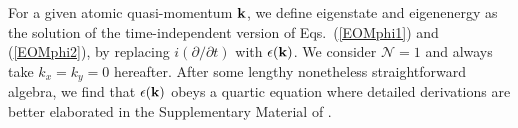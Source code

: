 \documentclass[atoms,article,submit,moreauthors,pdftex,12pt,a4paper]{mdpi}
\begin{document}
For a given atomic quasi-momentum ${\bf k}$, we define eigenstate and eigenenergy as the solution of the time-independent version of Eqs.~(\ref{EOMphi1}) and (\ref{EOMphi2}),  by replacing $i(\partial/\partial t)$ with $\epsilon({\bf k})$. We consider $\mathcal{N}=1$ and always take $k_x =k_y=0$ hereafter. After some lengthy nonetheless straightforward algebra, we find that $\epsilon({\bf k})$ obeys a quartic equation
where detailed derivations are better elaborated in the Supplementary Material of \cite{cavitySOC}. 
\end{document}
